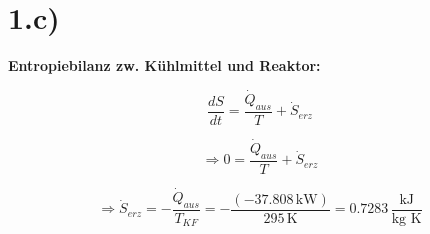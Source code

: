 \section*{1.c)}
\textbf{Entropiebilanz zw. Kühlmittel und Reaktor:}

\[
\frac{dS}{dt} = \frac{\dot{Q}_{aus}}{T} + \dot{S}_{erz}
\]

\[
\Rightarrow 0 = \frac{\dot{Q}_{aus}}{T} + \dot{S}_{erz}
\]

\[
\Rightarrow \dot{S}_{erz} = -\frac{\dot{Q}_{aus}}{T_{KF}} = -\frac{(-37.808 \, \text{kW})}{295 \, \text{K}} = 0.7283 \, \frac{\text{kJ}}{\text{kg K}}
\]